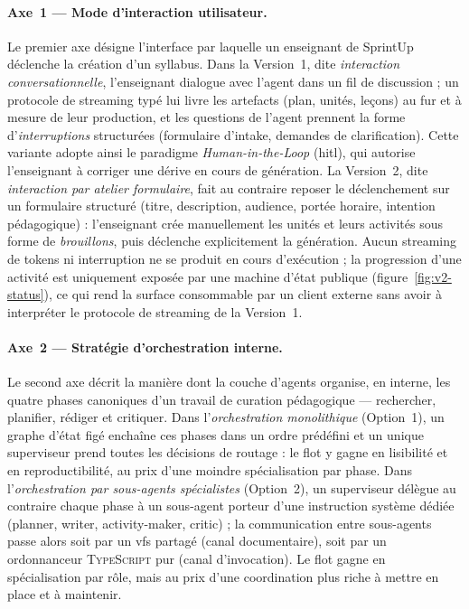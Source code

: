\paragraph{Axe~1 — Mode d'interaction utilisateur.}
Le premier axe désigne l'interface par laquelle un enseignant de
SprintUp déclenche la création d'un syllabus. Dans la Version~1, dite
\emph{interaction conversationnelle}, l'enseignant dialogue avec
l'agent dans un fil de discussion ; un protocole de streaming typé
lui livre les artefacts (plan, unités, leçons) au fur et à mesure
de leur production, et les questions de l'agent prennent la forme
d'\emph{interruptions} structurées (formulaire d'intake, demandes
de clarification). Cette variante adopte ainsi le paradigme
\emph{Human-in-the-Loop} (\gls{hitl}), qui autorise l'enseignant à
corriger une dérive en cours de génération. La Version~2, dite
\emph{interaction par atelier formulaire}, fait au contraire reposer
le déclenchement sur un formulaire structuré (titre, description,
audience, portée horaire, intention pédagogique) : l'enseignant crée
manuellement les unités et leurs activités sous forme de
\emph{brouillons}, puis déclenche explicitement la génération. Aucun
streaming de tokens ni interruption ne se produit en cours
d'exécution ; la progression d'une activité est uniquement exposée
par une machine d'état publique (figure~\ref{fig:v2-status}), ce qui
rend la surface consommable par un client externe sans avoir à
interpréter le protocole de streaming de la Version~1.

\paragraph{Axe~2 — Stratégie d'orchestration interne.}
Le second axe décrit la manière dont la couche d'agents organise,
en interne, les quatre phases canoniques d'un travail de
curation pédagogique — rechercher, planifier, rédiger et critiquer.
Dans l'\emph{orchestration monolithique} (Option~1), un graphe d'état
figé enchaîne ces phases dans un ordre prédéfini et un unique
superviseur prend toutes les décisions de routage : le flot y gagne
en lisibilité et en reproductibilité, au prix d'une moindre
spécialisation par phase. Dans l'\emph{orchestration par sous-agents
spécialistes} (Option~2), un superviseur délègue au contraire chaque
phase à un sous-agent porteur d'une instruction système dédiée
(planner, writer, activity-maker, critic) ; la communication entre
sous-agents passe alors soit par un \gls{vfs} partagé (canal
documentaire), soit par un ordonnanceur \textsc{TypeScript} pur
(canal d'invocation). Le flot gagne en spécialisation par rôle, mais
au prix d'une coordination plus riche à mettre en place et à
maintenir.


